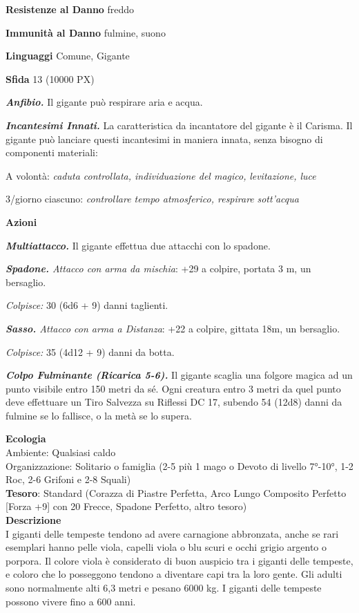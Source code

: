 \begin{multicols}{2}
\textbf{Resistenze al Danno} freddo

\textbf{Immunità al Danno} fulmine, suono

\textbf{Linguaggi} Comune, Gigante

\textbf{Sfida} 13 (10000 PX)

\textit{\textbf{Anfibio.}} Il gigante può respirare aria e acqua.

\textit{\textbf{Incantesimi Innati.}} La caratteristica da incantatore del gigante è il Carisma. Il gigante può lanciare questi incantesimi in maniera innata, senza bisogno di componenti materiali:

A volontà: \textit{caduta controllata, individuazione del magico,} \textit{levitazione, luce}

3/giorno ciascuno: \textit{controllare tempo atmosferico, respirare} \textit{sott'acqua}

\textbf{Azioni}

\textit{\textbf{Multiattacco.}} Il gigante effettua due attacchi con lo spadone.

\textit{\textbf{Spadone.} Attacco con arma da mischia}: +29 a colpire, portata 3 m, un bersaglio.

\textit{Colpisce:} 30 (6d6 + 9) danni taglienti.

\textit{\textbf{Sasso.} Attacco con arma a Distanza}: +22 a colpire, gittata 18m, un bersaglio.

\textit{Colpisce:} 35 (4d12 + 9) danni da botta.

\textit{\textbf{Colpo Fulminante (Ricarica 5-6).}} Il gigante scaglia una folgore magica ad un punto visibile entro 150 metri da sé. Ogni creatura entro 3 metri da quel punto deve effettuare un Tiro Salvezza su Riflessi DC 17, subendo 54 (12d8) danni da fulmine se lo fallisce, o la metà se lo supera.

\textbf{Ecologia}\\
Ambiente: Qualsiasi caldo\\
Organizzazione: Solitario o famiglia (2-5 più 1 mago o Devoto di livello 7°-10°, 1-2 Roc, 2-6 Grifoni e 2-8 Squali)\\
\textbf{Tesoro}: Standard (Corazza di Piastre Perfetta, Arco Lungo Composito Perfetto [Forza +9] con 20 Frecce, Spadone Perfetto, altro tesoro)\\
\textbf{Descrizione}\\
I giganti delle tempeste tendono ad avere carnagione abbronzata, anche se rari esemplari hanno pelle viola, capelli viola o blu scuri e occhi grigio argento o porpora. Il colore viola è considerato di buon auspicio tra i giganti delle tempeste, e coloro che lo posseggono tendono a diventare capi tra la loro gente. Gli adulti sono normalmente alti 6,3 metri e pesano 6000 kg. I giganti delle tempeste possono vivere fino a 600 anni.


\end{multicols}
